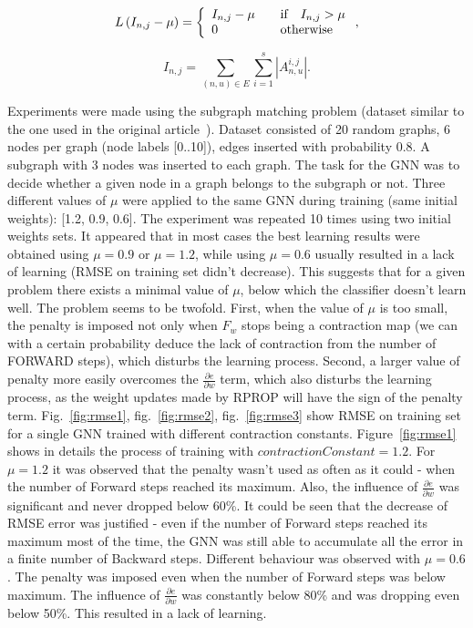 \documentclass[a4paper, 11pt, twocolumn]{spie}  %
\begin{document}
\begin{equation}
L\left(I_{n,j} - \mu\right) = \left\{
	\begin{array}{l l}
		I_{n,j} - \mu & \quad \text{if} \quad I_{n,j} > \mu \\
		0 & \quad \text{otherwise}
	\end{array} \right. ,
\label{eq:contraction}
\end{equation}

\begin{equation}
I_{n,j} = \sum_{(n, u) \in E} \sum_{i=1}^{s}|A_{n,u}^{i,j}|.
\end{equation}

Experiments were made using the subgraph matching problem (dataset similar to the one used in the original article~). Dataset consisted of 20 random graphs, 6 nodes per graph (node labels [0..10]), edges inserted with probability 0.8. A subgraph with 3 nodes was inserted to each graph. The task for the GNN was to decide whether a given node in a graph belongs to the subgraph or not. Three different values of $\mu$ were applied to the same GNN during training (same initial weights): [1.2, 0.9, 0.6]. The experiment was repeated 10 times using two initial weights sets. It appeared that in most cases the best learning results were obtained using $\mu = 0.9$ or $\mu = 1.2$, while using $\mu = 0.6$ usually resulted in a lack of learning (RMSE on training set didn't decrease). This suggests that for a given problem there exists a minimal value of $\mu$, below which the classifier doesn't learn well. The problem seems to be twofold. First, when the value of $\mu$ is too small, the penalty is imposed not only when $F_w$ stops being a contraction map (we can with a certain probability deduce the lack of contraction from the number of FORWARD steps), which disturbs the learning process. Second, a larger value of penalty more easily overcomes the $\frac{\partial e}{\partial w}$ term, which also disturbs the learning process, as the weight updates made by RPROP will have the sign of the penalty term. Fig.~\ref{fig:rmse1}, fig.~\ref{fig:rmse2}, fig.~\ref{fig:rmse3} show RMSE on training set for a single GNN trained with different contraction constants. Figure~\ref{fig:rmse1} shows in details the process of training with $contractionConstant = 1.2$. For $\mu = 1.2$ it was observed that the penalty wasn't used as often as it could - when the number of Forward steps reached its maximum. Also, the influence of $\frac{\partial e}{\partial w}$ was significant and never dropped below 60\%. It could be seen that the decrease of RMSE error was justified - even if the number of Forward steps reached its maximum most of the time, the GNN was still able to accumulate all the error in a finite number of Backward steps. Different behaviour was observed with $\mu = 0.6$. The penalty was imposed even when the number of Forward steps was below maximum. The influence of $\frac{\partial e}{\partial w}$ was constantly below 80\% and was dropping even below 50\%. This resulted in a lack of learning.
\end{document}
